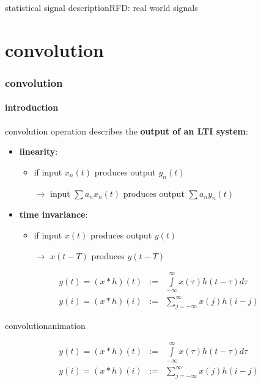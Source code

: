             \begin{frame}{statistical signal description}{RFD: real world signals}
            \end{frame}	
 
    \section{convolution}
	\begin{frame}\frametitle{convolution}\framesubtitle{introduction}
        convolution operation describes the \textbf{output of an LTI system}:
        \pause
        \begin{itemize}
            \item   \textbf{linearity}: 
                \begin{itemize}
                    \item if input $x_n(t)$ produces output $y_n(t)$
                    \item[$\rightarrow$] input $\sum a_n x_n(t)$ produces output $\sum a_n y_n(t)$
                \end{itemize}
            \item   \textbf{time invariance}:
                \begin{itemize}
                    \item   if input $x(t)$ produces output $y(t)$
                    \item[$\rightarrow$] $x(t-T)$ produces $y(t-T)$
                \end{itemize}
        \end{itemize}
        \pause
        \begin{eqnarray*}
            y(t) = (x \ast h)(t) &:=& \int\limits_{-\infty}^{\infty}x(\tau)h(t-\tau)d\tau\\
            y(i) = (x \ast h)(i) &:=& \sum\limits_{j=-\infty}^{\infty}x(j)h(i-j)
        \end{eqnarray*}
	\end{frame}
        
    \begin{frame}{convolution}{animation}
        \vspace{-5mm}
        \begin{footnotesize}
            \begin{eqnarray*}
                y(t) = (x \ast h)(t) &:=& \int\limits_{-\infty}^{\infty}x(\tau)h(t-\tau)d\tau\\
                y(i) = (x \ast h)(i) &:=& \sum\limits_{j=-\infty}^{\infty}x(j)h(i-j)
            \end{eqnarray*}
        \end{footnotesize}
    \end{frame}


